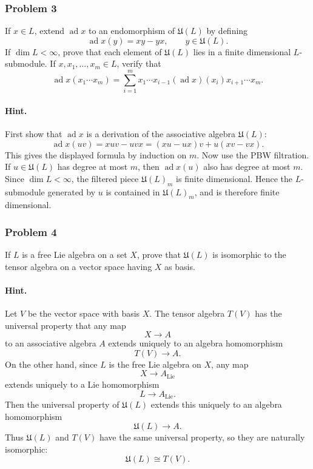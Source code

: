 \documentclass[12pt, a4paper]{article}
\begin{document}
\subsubsection{Problem 3}

If \(x\in L\), extend \(\operatorname{ad}x\) to an endomorphism of
\(\mathfrak U(L)\) by defining
\[
\operatorname{ad}x(y)=xy-yx,
\qquad y\in\mathfrak U(L).
\]
If \(\dim L<\infty\), prove that each element of \(\mathfrak U(L)\) lies in a
finite dimensional \(L\)-submodule. If \(x,x_1,\ldots,x_m\in L\), verify that
\[
\operatorname{ad}x(x_1\cdots x_m)
=
\sum_{i=1}^m x_1\cdots x_{i-1}(\operatorname{ad}x)(x_i)x_{i+1}\cdots x_m .
\]

\paragraph{Hint.}
First show that \(\operatorname{ad}x\) is a derivation of the associative
algebra \(\mathfrak U(L)\):
\[
\operatorname{ad}x(uv)=xu v-uvx=(xu-ux)v+u(xv-vx).
\]
This gives the displayed formula by induction on \(m\). Now use the PBW
filtration. If \(u\in \mathfrak U(L)\) has degree at most \(m\), then
\(\operatorname{ad}x(u)\) also has degree at most \(m\). Since \(\dim L<\infty\),
the filtered piece \(\mathfrak U(L)_m\) is finite dimensional. Hence the
\(L\)-submodule generated by \(u\) is contained in \(\mathfrak U(L)_m\), and is
therefore finite dimensional.

\subsubsection{Problem 4}

If \(L\) is a free Lie algebra on a set \(X\), prove that \(\mathfrak U(L)\) is
isomorphic to the tensor algebra on a vector space having \(X\) as basis.

\paragraph{Hint.}
Let \(V\) be the vector space with basis \(X\). The tensor algebra \(T(V)\) has
the universal property that any map
\[
X\to A
\]
to an associative algebra \(A\) extends uniquely to an algebra homomorphism
\[
T(V)\to A.
\]
On the other hand, since \(L\) is the free Lie algebra on \(X\), any map
\[
X\to A_{\operatorname{Lie}}
\]
extends uniquely to a Lie homomorphism
\[
L\to A_{\operatorname{Lie}}.
\]
Then the universal property of \(\mathfrak U(L)\) extends this uniquely to an
algebra homomorphism
\[
\mathfrak U(L)\to A.
\]
Thus \(\mathfrak U(L)\) and \(T(V)\) have the same universal property, so they
are naturally isomorphic:
\[
\mathfrak U(L)\cong T(V).
\]
\end{document}

